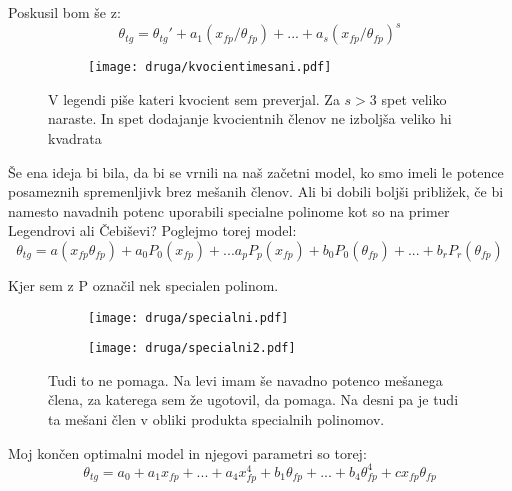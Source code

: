 \documentclass{article}
\begin{document}
Poskusil bom še z:
\begin{equation*}
\theta_{tg} = \theta_{tg}' + a_1 (x_{fp}/\theta_{fp}) + ... + a_s (x_{fp}/\theta_{fp})^{s}
\end{equation*}

\begin{figure}[H]
\begin{subfigure}{\textwidth}
\texttt{[image: druga/kvocientimesani.pdf]}
\end{subfigure}
\caption*{V legendi piše kateri kvocient sem preverjal. Za $s>3$ spet veliko naraste. In spet dodajanje kvocientnih členov ne izboljša veliko hi kvadrata}
\end{figure}

Še ena ideja bi bila, da bi se vrnili na naš začetni model, ko smo imeli le potence posameznih spremenljivk brez mešanih členov. Ali bi dobili boljši približek, če bi namesto navadnih potenc uporabili specialne polinome kot so na primer Legendrovi ali Čebiševi? Poglejmo torej model:
\begin{equation*}
\theta_{tg} = a (x_{fp} \theta_{fp}) + a_0 P_0(x_{fp}) + ... a_p P_p(x_{fp}) + b_0 P_0(\theta_{fp}) + ... + b_r P_r(\theta_{fp})
\end{equation*}

Kjer sem z P označil nek specialen polinom.

\begin{figure}[H]
\begin{subfigure}{.49\textwidth}
\texttt{[image: druga/specialni.pdf]}
\end{subfigure}
\begin{subfigure}{.49\textwidth}
\texttt{[image: druga/specialni2.pdf]}
\end{subfigure}
\caption*{Tudi to ne pomaga. Na levi imam še navadno potenco mešanega člena, za katerega sem že ugotovil, da pomaga. Na desni pa je tudi ta mešani člen v obliki produkta specialnih polinomov.}
\end{figure}

Moj končen optimalni model in njegovi parametri so torej:
\begin{equation*}
\theta_{tg} = a_0 + a_1 x_{fp} + ... + a_4 x_{fp}^4 + b_1 \theta_{fp} + ... + b_4 \theta_{fp}^4 + c x_{fp}\theta_{fp}
\end{equation*}
\end{document}
